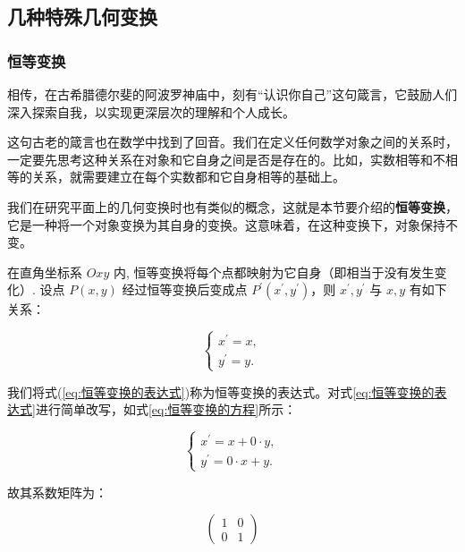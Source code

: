 \documentclass[lang=cn,newtx,10pt,scheme=chinese]{elegantbook}
\begin{document}
\subsection{几种特殊几何变换}

\subsubsection{恒等变换}
\label{subsubsec:恒等变换}

相传，在古希腊德尔斐的阿波罗神庙中，刻有“认识你自己”这句箴言，它鼓励人们深入探索自我，以实现更深层次的理解和个人成长。

这句古老的箴言也在数学中找到了回音。我们在定义任何数学对象之间的关系时，一定要先思考这种关系在对象和它自身之间是否是存在的。比如，实数相等和不相等的关系，就需要建立在每个实数都和它自身相等的基础上。

我们在研究平面上的几何变换时也有类似的概念，这就是本节要介绍的\textcolor{third}{\bf 恒等变换}，它是一种将一个对象变换为其自身的变换。这意味着，在这种变换下，对象保持不变。

 在直角坐标系 $O x y$ 内, 恒等变换将每个点都映射为它自身（即相当于没有发生变化）. 设点 $P(x, y)$ 经过恒等变换后变成点 $P^{\prime}\left(x^{\prime}, y^{\prime}\right)$，则 $x^{\prime}, y^{\prime}$ 与 $x, y$ 有如下关系：

\begin{equation}
\left\{\begin{array}{l}
x^{\prime}=x, \\
y^{\prime}=y .
\end{array}\right.
\label{eq:恒等变换的表达式}
\end{equation}

我们将式(\ref{eq:恒等变换的表达式})称为恒等变换的表达式。对式\ref{eq:恒等变换的表达式}进行简单改写，如式\ref{eq:恒等变换的方程}所示：

\begin{equation}
\left\{\begin{array}{l}
x^{\prime}=x + 0\cdot y, \\
y^{\prime}= 0\cdot x + y .
\end{array}\right.
\label{eq:恒等变换的方程}
\end{equation}

故其系数矩阵为：

\begin{equation}
\left(\begin{array}{rr}
1  & 0 \\
0  & 1
\end{array}\right)
\label{eq:恒等变换矩阵}
\end{equation}
\end{document}
